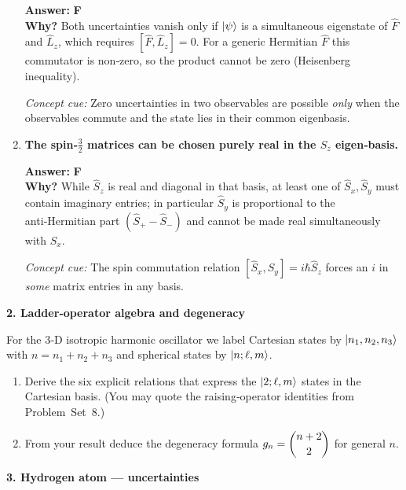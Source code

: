 \documentclass[12pt]{article}
\newcommand{\qs}{\bigskip\bigskip}
\newcommand{\vv}{\medskip}
\begin{document}
\begin{enumerate}[label=\textbf{\alph*)},itemsep=1.2\baselineskip]
      \textbf{Answer:} \textbf{F}\\
      \textbf{Why?}  Both uncertainties vanish only if $\ket{\psi}$ is a simultaneous
      eigenstate of \(\hat F\) and \(\hat L_z\), which requires
      $[\hat F,\hat L_z]=0$.  For a generic Hermitian $\hat F$ this commutator is
      non‑zero, so the product cannot be zero (Heisenberg
      inequality).\par
      \emph{Concept cue:}  Zero uncertainties in two observables are possible
      \emph{only} when the observables commute and the state lies in their common
      eigenbasis.

\item \textbf{The spin‑$\tfrac{3}{2}$ matrices can be chosen purely real in the
      $S_z$ eigen‑basis.}

      \textbf{Answer:} \textbf{F}\\
      \textbf{Why?}  While $\hat S_z$ is real and diagonal in that basis,
      at least one of $\hat S_x,\hat S_y$ must contain imaginary entries;
      in particular $\hat S_y$ is proportional to the anti‑Hermitian part
      $(\hat S_+-\hat S_-)$ and cannot be made real simultaneously with
      $\hat S_x$.\par
      \emph{Concept cue:}  The spin commutation relation
      $[\hat S_x,\hat S_y]=i\hbar\hat S_z$ forces an $i$ in \emph{some}
      matrix entries in any basis.

\end{enumerate}

\newpage
{\large\bfseries 2.\; Ladder‑operator algebra and degeneracy}\qs

For the 3‑D isotropic harmonic oscillator we label Cartesian
states by $\ket{n_1,n_2,n_3}$ with
$n=n_1+n_2+n_3$ and spherical states by $\ket{n; \ell, m}$.

\begin{enumerate}[label=\textbf{\alph*)}, leftmargin=1.2cm]
  \item  Derive the six explicit relations that express the
         $\ket{2;\ell,m}$ states in the Cartesian basis. (You may quote
         the raising‑operator identities from Problem Set 8.)\vv
  \item  From your result deduce the
         degeneracy formula $g_n = \dbinom{n+2}{2}$ for general $n$.
\end{enumerate}

\newpage
{\large\bfseries 3.\; Hydrogen atom — uncertainties}\qs
\end{document}
